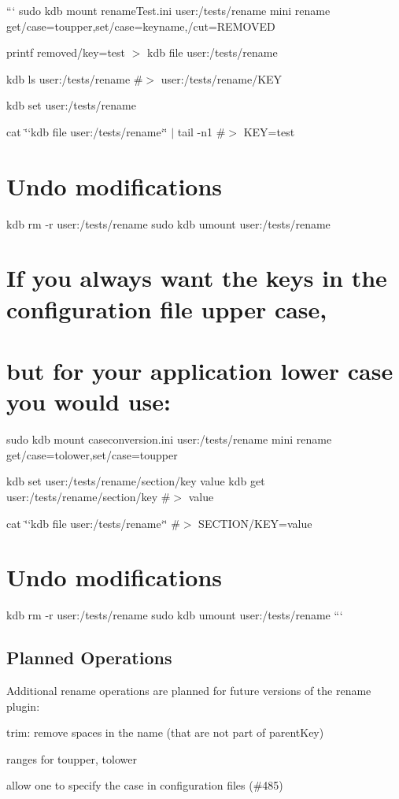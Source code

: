 ``` sudo kdb mount rename\+Test.\+ini user\+:/tests/rename mini rename get/case=toupper,set/case=keyname,/cut=R\+E\+M\+O\+V\+ED

printf \textquotesingle{}removed/key=test\textquotesingle{} $>$ {\ttfamily kdb file user\+:/tests/rename}

kdb ls user\+:/tests/rename \#$>$ user\+:/tests/rename/\+K\+EY

kdb set user\+:/tests/rename

cat \char`\"{}`kdb file user\+:/tests/rename`\char`\"{} $\vert$ tail -\/n1 \#$>$ K\+EY=test\hypertarget{autotoc_md570_autotoc_md581}{}\section{Undo modifications}\label{autotoc_md570_autotoc_md581}
kdb rm -\/r user\+:/tests/rename sudo kdb umount user\+:/tests/rename 
\begin{DoxyCode}
\end{DoxyCode}
 \hypertarget{autotoc_md570_autotoc_md582}{}\section{If you always want the keys in the configuration file upper case,}\label{autotoc_md570_autotoc_md582}
\hypertarget{autotoc_md570_autotoc_md583}{}\section{but for your application lower case you would use\+:}\label{autotoc_md570_autotoc_md583}
sudo kdb mount caseconversion.\+ini user\+:/tests/rename mini rename get/case=tolower,set/case=toupper

kdb set user\+:/tests/rename/section/key value kdb get user\+:/tests/rename/section/key \#$>$ value

cat \char`\"{}`kdb file user\+:/tests/rename`\char`\"{} \#$>$ S\+E\+C\+T\+I\+O\+N/\+K\+EY=value\hypertarget{autotoc_md570_autotoc_md584}{}\section{Undo modifications}\label{autotoc_md570_autotoc_md584}
kdb rm -\/r user\+:/tests/rename sudo kdb umount user\+:/tests/rename ```\hypertarget{autotoc_md570_autotoc_md585}{}\subsection{Planned Operations}\label{autotoc_md570_autotoc_md585}
Additional rename operations are planned for future versions of the rename plugin\+:


\begin{DoxyItemize}
\item trim\+: remove spaces in the name (that are not part of parent\+Key)
\item ranges for toupper, tolower
\item allow one to specify the case in configuration files (\#485) 
\end{DoxyItemize}